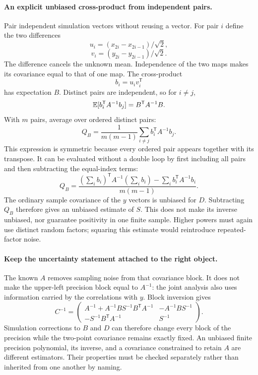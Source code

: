 \paragraph{An explicit unbiased cross-product from independent pairs.}
Pair independent simulation vectors without reusing a vector. For pair $i$
define the two differences
\begin{equation}
 u_i=(x_{2i}-x_{2i-1})/\sqrt{2},
\end{equation}
\begin{equation}
 v_i=(y_{2i}-y_{2i-1})/\sqrt{2}.
\end{equation}
The difference cancels the unknown mean. Independence of the two maps makes
its covariance equal to that of one map. The cross-product
\begin{equation}
 b_i=u_iv_i^{\mathsf T}
\end{equation}
has expectation $B$. Distinct pairs are independent, so for $i\ne j$,
\begin{equation}
 \mathbb{E}[b_i^{\mathsf T}A^{-1}b_j]=B^{\mathsf T}A^{-1}B.
\end{equation}
With $m$ pairs, average over ordered distinct pairs:
\begin{equation}
 Q_B=\frac{1}{m(m-1)}\sum_{i\ne j}b_i^{\mathsf T}A^{-1}b_j.
\end{equation}
This expression is symmetric because every ordered pair appears together
with its transpose. It can be evaluated without a double loop by first
including all pairs and then subtracting the equal-index terms:
\begin{equation}
 Q_B=\frac{(\sum_i b_i)^{\mathsf T}A^{-1}(\sum_i b_i)
 -\sum_i b_i^{\mathsf T}A^{-1}b_i}{m(m-1)}.
\end{equation}
The ordinary sample covariance of the $y$ vectors is unbiased for $D$.
Subtracting $Q_B$ therefore gives an unbiased estimate of $S$. This does not
make its inverse unbiased, nor guarantee positivity in one finite sample.
Higher powers must again use distinct random factors; squaring this estimate
would reintroduce repeated-factor noise.

\paragraph{Keep the uncertainty statement attached to the right object.}
The known $A$ removes sampling noise from that covariance block. It does not
make the upper-left precision block equal to $A^{-1}$: the joint analysis
also uses information carried by the correlations with $y$. Block inversion
gives
\begin{equation}
 C^{-1}=\begin{pmatrix}
 A^{-1}+A^{-1}BS^{-1}B^{\mathsf T}A^{-1}&-A^{-1}BS^{-1}\\
 -S^{-1}B^{\mathsf T}A^{-1}&S^{-1}
 \end{pmatrix}.
\end{equation}
Simulation corrections to $B$ and $D$ can therefore change every block of
the precision while the two-point covariance remains exactly fixed.
An unbiased finite precision polynomial, its inverse, and a covariance
constrained to retain $A$ are different estimators. Their properties must
be checked separately rather than inherited from one another by naming.

